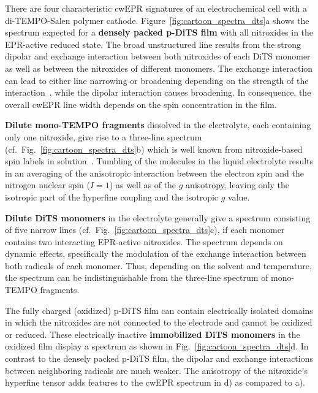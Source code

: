 \par
There are four characteristic cwEPR signatures of an electrochemical cell with a di-TEMPO-Salen polymer cathode. Figure~\ref{fig:cartoon_spectra_dts}a shows the spectrum expected for a \textbf{densely packed p-DiTS film} with all nitroxides in the EPR-active reduced state. The broad unstructured line results from the strong dipolar and exchange interaction between both nitroxides of each DiTS monomer as well as between the nitroxides of different monomers. The exchange interaction can lead to either line narrowing or broadening depending on the strength of the interaction~\cite{Anderson1953}, while the dipolar interaction causes broadening. In consequence, the overall cwEPR line width depends on the spin concentration in the film.
\par 
\textbf{Dilute mono-TEMPO fragments} dissolved in the electrolyte, each containing only one nitroxide, give rise to a three-line spectrum (cf.\ Fig.~\ref{fig:cartoon_spectra_dts}b) which is well known from nitroxide-based spin labels in solution~\cite{Liu_2008}. Tumbling of the molecules in the liquid electrolyte results in an averaging of the anisotropic interaction between the electron spin and the nitrogen nuclear spin ($I = 1$) as well as of the $g$ anisotropy, leaving only the isotropic part of the hyperfine coupling and the isotropic $g$ value. 
\par
\textbf{Dilute DiTS monomers} in the electrolyte generally give a spectrum consisting of five narrow lines (cf.\ Fig.~\ref{fig:cartoon_spectra_dts}c), if each monomer contains two interacting EPR-active nitroxides. The spectrum depends on dynamic effects, specifically the modulation of the exchange interaction between both radicals of each monomer.  Thus, depending on the solvent and temperature, the spectrum can be indistinguishable from the three-line spectrum of mono-TEMPO fragments.
\par
The fully charged (oxidized) p-DiTS film can contain electrically isolated domains in which the nitroxides are not connected to the electrode and cannot be oxidized or reduced. These electrically inactive \textbf{immobilized DiTS monomers} in the oxidized film display a spectrum as shown in Fig.~\ref{fig:cartoon_spectra_dts}d. In contrast to the densely packed p-DiTS film, the dipolar and exchange interactions between neighboring radicals are much weaker. The anisotropy of the nitroxide's hyperfine tensor adds features to the cwEPR spectrum in d) as compared to a).
